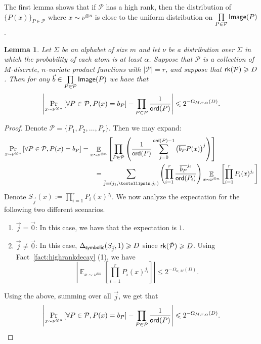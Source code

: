 \documentclass[10pt,a4paper]{amsart}
\newtheorem{lemma}[thm]{Lemma}
\newcommand\card[1]{\left| {#1} \right|}
\newcommand\Prob[2]{{\Pr_{#1}\left[ {#2} \right]}}
\newcommand\Expect[2]{{\mathop{\mathbb{E}}_{#1}\left[ {#2} \right]}}
\renewcommand\geq{\geqslant}
\renewcommand\leq{\leqslant}
\begin{document}
The first lemma shows that if $\mathcal{P}$ has a high rank, then the distribution of $\{ P(x)\}_{P\in\mathcal{P}}$ where $x\sim 
\nu^{\otimes n}$ is close to the uniform distribution on $\prod\limits_{P\in\mathcal{P}}{\sf Image}(P)$.
      \begin{lemma}
    \label{lemma:quasirandom_onefunc}
		Let $\Sigma$ be an alphabet of size $m$ and let $\nu$ be a distribution over $\Sigma$ in which the probability of each atom is at least $\alpha$.
		Suppose that $\mathcal{P}$ is a collection of $M$-discrete, $n$-variate product functions with $|\mathcal{P}|=r$, and suppose that ${\sf rk}(\mathcal{P})\geq D$. Then for any $\vec{b}\in\prod\limits_{P\in\mathcal{P}}{\sf Image}(P)$ we have that
		\[
		\card{\Prob{x \sim\nu^{\otimes n}}{\forall P\in \mathcal{P}, P(x)= b_P}
		- \prod\limits_{P\in\mathcal{P}}\frac{1}{{\sf ord}(P)}}\leq 2^{-\Omega_{M,r,\alpha}(D)}.
		\]
	\end{lemma}

    \begin{proof}
 Denote $\mathcal{P} = \{ P_1, P_2, \ldots, P_r\}$. Then we may expand:
      \begin{align*}
          \Prob{x\sim\nu^{\otimes  n}}{\forall P\in \mathcal{P}, P(x)= b_P} &= \Expect{{x\sim\nu^{\otimes  n}}}{\prod_{P\in \mathcal{P}}\left( \frac{1}{{\sf ord}(P)} \sum_{j=0}^{{\sf ord}(P)-1}\left(\overline{b_P}P(x)\right)^j\right)}\\
          &\quad\quad= \sum_{\vec{j} = (j_1, \ldots, j_r)}  \left(\prod_{i=1}^r \frac{\overline{b_P}^{j_i}}{{\sf ord}(P_i)}\right) \Expect{x\sim\nu^{\otimes  n}}{\prod_{i=1}^r P_i(x)^{j_i}}\\
      \end{align*}
      Denote $S_{\vec{j}}(x):= \prod_{i=1}^r P_i(x)^{j_i}$. 
     We now analyze the expectation for the following two different scenarios. 
     \begin{enumerate}
         \item[(a)] $\vec{j}  = \vec{0}$: In this case, we have that the expectation is $1$.
         
         \item[(b)] $\vec{j}  \neq \vec{0}$: In this case, $\Delta_{{\sf symbolic}}(S_{\vec{j}},1)\geq D$ since ${\sf rk}(\tilde{\mathcal{P}})\geq D$. Using Fact~\ref{fact:highrankdecay} (1), we have 
         \[
         \card{\Expect{x\sim\nu^{\otimes  n}}{\prod_{i=1}^r P_i(x)^{j_i}}} \leq 2^{-\Omega_{\alpha, M}(D)}.
         \]
     \end{enumerate}
        Using the above, summing over all $\vec{j}$, we get that
\[
		\card{\Prob{x \sim\nu^{\otimes n}}{\forall P\in \mathcal{P}, P(x)= b_P}
		- \prod\limits_{P\in\mathcal{P}}\frac{1}{{\sf ord}(P)}}\leq 2^{-\Omega_{M,r,\alpha}(D)}.
        \qedhere
		\]

    \end{proof}
\end{document}
